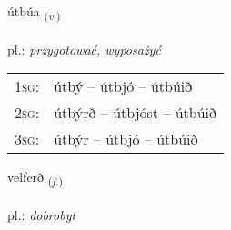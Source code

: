 \documentclass[frontgrid, backgrid]{flacards}\usepackage[]{graphicx}\usepackage[]{xcolor}
\begin{document}
\renewcommand{\flhead}{\vskip5pt \fboxsep=0pt {\small\bfseries\footnotesize Sagnorð | czasownik}}
\renewcommand{\fcfoot}{\vskip5pt \fboxsep=0pt \hspace{2pt}{\small\bfseries\footnotesize 3K}}

\renewcommand{\blhead}{\vskip5pt {\small\bfseries\footnotesize Sagnorð | czasownik }}
\renewcommand{\bcfoot}{\vskip5pt \hspace{2pt}{\small\bfseries\footnotesize 3K}}


{útbúa \small{\textsubscript{(\textit{v.})}} \\[1ex] %
\textphonetic{[uːtpua]} \\
pl.: \emph{przygotować, wyposażyć} \\  [2ex]
\renewcommand*{\arraystretch}{0.8}
\begin{tabular}{p{1cm}l}
\textsc{1sg}: & útbý -- útbjó -- útbúið \\ 
\textsc{2sg}: & útbýrð -- útbjóst -- útbúið \\ 
\textsc{3sg}: & útbýr -- útbjó -- útbúið \\ 
\end{tabular}
}

\renewcommand{\flhead}{\vskip5pt \fboxsep=0pt {\small\bfseries\footnotesize Nafnorð | rzeczownik}}
\renewcommand{\fcfoot}{\vskip5pt \fboxsep=0pt \hspace{2pt}{\small\bfseries\footnotesize 3K}}

\renewcommand{\blhead}{\vskip5pt {\small\bfseries\footnotesize Nafnorð | rzeczownik }}
\renewcommand{\bcfoot}{\vskip5pt \hspace{2pt}{\small\bfseries\footnotesize 3K}}


{velferð \small{\textsubscript{(\textit{f.})}} \\[1ex] %
\textphonetic{[vɛlfɛrð]} \\
pl.: \emph{dobrobyt} \\  [2ex]
\renewcommand*{\arraystretch}{0.8}
}
\end{document}
